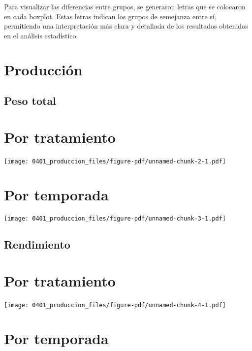 \documentclass[
  letterpaper,
  DIV=11,
  numbers=noendperiod]{scrreprt}
\begin{document}
Para visualizar las diferencias entre grupos, se generaron letras que se
colocaron en cada boxplot. Estas letras indican los grupos de semejanza
entre sí, permitiendo una interpretación más clara y detallada de los
resultados obtenidos en el análisis estadístico.

\chapter{Producción}\label{producciuxf3n-1}

\section{Peso total}\label{peso-total-1}

\chapter{Por tratamiento}

\begin{center}
\texttt{[image: 0401\_produccion\_files/figure-pdf/unnamed-chunk-2-1.pdf]}
\end{center}

\chapter{Por temporada}

\begin{center}
\texttt{[image: 0401\_produccion\_files/figure-pdf/unnamed-chunk-3-1.pdf]}
\end{center}

\section{Rendimiento}\label{rendimiento-1}

\chapter{Por tratamiento}

\begin{center}
\texttt{[image: 0401\_produccion\_files/figure-pdf/unnamed-chunk-4-1.pdf]}
\end{center}

\chapter{Por temporada}
\end{document}
